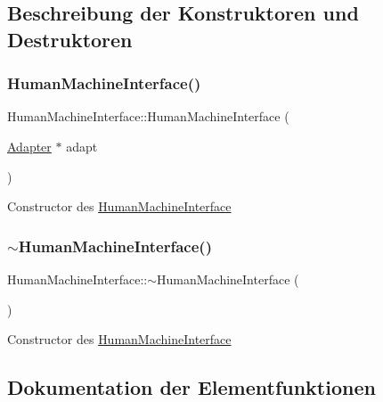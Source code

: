 \subsection{Beschreibung der Konstruktoren und Destruktoren}
\hypertarget{class_human_machine_interface_aee37229a726c66857601422ba1605ac6}{}\label{class_human_machine_interface_aee37229a726c66857601422ba1605ac6} 
\subsubsection{\texorpdfstring{Human\+Machine\+Interface()}{HumanMachineInterface()}}
{\footnotesize\ttfamily Human\+Machine\+Interface\+::\+Human\+Machine\+Interface (\begin{DoxyParamCaption}\item[{\hyperlink{class_adapter}{Adapter} $\ast$}]{adapt }\end{DoxyParamCaption})}

Constructor des \hyperlink{class_human_machine_interface}{Human\+Machine\+Interface} \hypertarget{class_human_machine_interface_a2ac7ae9e7e6be379da946eac459ea243}{}\label{class_human_machine_interface_a2ac7ae9e7e6be379da946eac459ea243} 
\subsubsection{\texorpdfstring{$\sim$\+Human\+Machine\+Interface()}{~HumanMachineInterface()}}
{\footnotesize\ttfamily Human\+Machine\+Interface\+::$\sim$\+Human\+Machine\+Interface (\begin{DoxyParamCaption}{ }\end{DoxyParamCaption})\hspace{0.3cm}{\ttfamily [virtual]}}

Constructor des \hyperlink{class_human_machine_interface}{Human\+Machine\+Interface} 

\subsection{Dokumentation der Elementfunktionen}
\hypertarget{class_human_machine_interface_ad9844e21fd01872ad78afb9e16acc59f}{}\label{class_human_machine_interface_ad9844e21fd01872ad78afb9e16acc59f} 
